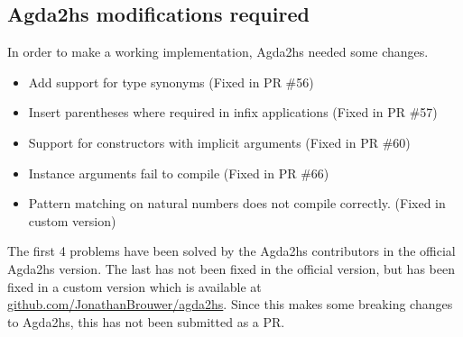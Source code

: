 \subsection{Agda2hs modifications required}
In order to make a working implementation, Agda2hs needed some changes.
\begin{itemize}
    \item Add support for type synonyms (Fixed in PR \#56)
    \item Insert parentheses where required in infix applications (Fixed in PR \#57)
    \item Support for constructors with implicit arguments (Fixed in PR \#60)
    \item Instance arguments fail to compile (Fixed in PR \#66)
    \item Pattern matching on natural numbers does not compile correctly. (Fixed in custom version)
\end{itemize}
The first 4 problems have been solved by the Agda2hs contributors in the official Agda2hs version. The last has not been fixed in the official version, but has been fixed in a custom version which is available at \textcolor{blue}{\href{https://github.com/JonathanBrouwer/agda2hs}{github.com/JonathanBrouwer/agda2hs}}. Since this makes some breaking changes to Agda2hs, this has not been submitted as a PR.